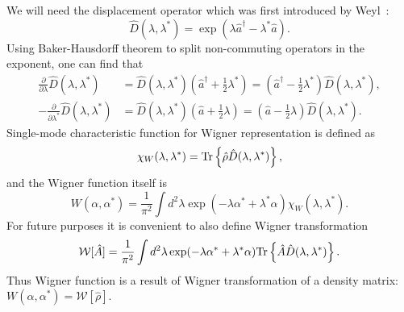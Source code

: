 We will need the displacement operator which was first introduced by Weyl~\cite{Weyl1950}:
\[
	\hat{D}(\lambda, \lambda^*) = \exp(\lambda \hat{a}^\dagger - \lambda^* \hat{a}).
\]
Using Baker-Hausdorff theorem to split non-commuting operators in the exponent,
one can find that
\begin{equation}
\label{eqn:multimode-formalism:displacement-derivatives}
\begin{split}
	\frac{\partial}{\partial \lambda} \hat{D}(\lambda, \lambda^*)
	& = \hat{D}(\lambda, \lambda^*) (\hat{a}^\dagger + \frac{1}{2} \lambda^*)
	= (\hat{a}^\dagger - \frac{1}{2} \lambda^*) \hat{D}(\lambda, \lambda^*), \\
	-\frac{\partial}{\partial \lambda^*} \hat{D}(\lambda, \lambda^*)
	& = \hat{D}(\lambda, \lambda^*) (\hat{a} + \frac{1}{2} \lambda)
	= (\hat{a} - \frac{1}{2} \lambda) \hat{D}(\lambda, \lambda^*).
\end{split}
\end{equation}
Single-mode characteristic function for Wigner representation is defined as
\[
	\chi_W (\lambda, \lambda^*)
	= \mathrm{Tr} \left\{  \hat{\rho} \hat{D}(\lambda, \lambda^*)  \right\},
\]
and the Wigner function itself is
\begin{equation}
\label{eqn:multimode-formalism:single-mode-wigner}
	W (\alpha, \alpha^*)
	= \frac{1}{\pi^2} \int d^2 \lambda \exp(-\lambda \alpha^* + \lambda^* \alpha)
		\chi_W (\lambda, \lambda^*).
\end{equation}
For future purposes it is convenient to also define Wigner transformation 
\[
	\mathcal{W}[\hat{A}]
	= \frac{1}{\pi^2} \int d^2 \lambda \exp(-\lambda \alpha^* + \lambda^* \alpha)
		\mathrm{Tr} \left\{  \hat{A} \hat{D}(\lambda, \lambda^*)  \right\}.
\]
Thus Wigner function is a result of Wigner transformation of a density matrix: $W(\alpha, \alpha^*) = \mathcal{W}[\hat{\rho}]$.

